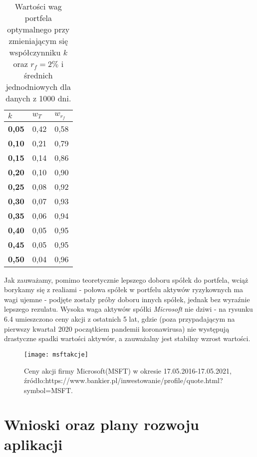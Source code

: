 \documentclass[magister]{dyplom}
\begin{document}
\begin{table}[ht]
	\centering
	\caption{Wartości wag portfela optymalnego przy zmieniającym się współczynniku $k$ oraz $r_f = 2\%$ i średnich jednodniowych dla danych z 1000 dni.}
	\begin{tabular}{|l|l|l|}
		\hline
		\textbf{$k$} & \textbf{$w_T$} & \textbf{$w_{r_f}$} \\ \hline
		\textbf{0,05} & 0,42          & 0,58           \\ \hline
		\textbf{0,10} & 0,21          & 0,79           \\ \hline
		\textbf{0,15} & 0,14          & 0,86           \\ \hline
		\textbf{0,20} & 0,10          & 0,90           \\ \hline
		\textbf{0,25} & 0,08          & 0,92           \\ \hline
		\textbf{0,30} & 0,07          & 0,93           \\ \hline
		\textbf{0,35} & 0,06          & 0,94           \\ \hline
		\textbf{0,40} & 0,05          & 0,95           \\ \hline
		\textbf{0,45} & 0,05          & 0,95           \\ \hline
		\textbf{0,50} & 0,04          & 0,96           \\ \hline
	\end{tabular}
\end{table}

Jak zauważamy, pomimo teoretycznie lepszego doboru spółek do portfela, wciąż borykamy się z realiami - połowa spółek w portfelu aktywów ryzykownych ma wagi ujemne - podjęte zostały próby doboru innych spółek, jednak bez wyraźnie lepszego rezulatu. Wysoka waga aktywów spółki \textit{Microsoft} nie dziwi - na rysunku 6.4 umieszczono ceny akcji z ostatnich 5 lat, gdzie (poza przypadającym na pierwszy kwartał 2020 początkiem pandemii koronawirusa) nie występują drastyczne spadki wartości aktywów, a zauważalny jest stabilny wzrost wartości.

\begin{figure}[ht]
	\centering
	\texttt{[image: msftakcje]}
	\caption{Ceny akcji firmy Microsoft(MSFT) w okresie 17.05.2016-17.05.2021,\newline
		źródło:https://www.bankier.pl/inwestowanie/profile/quote.html?symbol=MSFT.}
\end{figure}


\chapter{Wnioski oraz plany rozwoju aplikacji}
\end{document}
